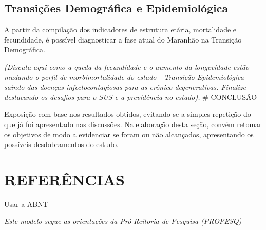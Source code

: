 \documentclass[
  brazilian,
  12pt,
]{article}
\begin{document}
\subsection{Transições Demográfica e
Epidemiológica}\label{transiuxe7uxf5es-demogruxe1fica-e-epidemioluxf3gica}

A partir da compilação dos indicadores de estrutura etária, mortalidade
e fecundidade, é possível diagnosticar a fase atual do Maranhão na
Transição Demográfica.

\emph{(Discuta aqui como a queda da fecundidade e o aumento da
longevidade estão mudando o perfil de morbimortalidade do estado -
Transição Epidemiológica - saindo das doenças infectocontagiosas para as
crônico-degenerativas. Finalize destacando os desafios para o SUS e a
previdência no estado).} \# CONCLUSÃO

Exposição com base nos resultados obtidos, evitando-se a simples
repetição do que já foi apresentado nas discussões. Na elaboração desta
seção, convém retomar os objetivos de modo a evidenciar se foram ou não
alcançados, apresentando os possíveis desdobramentos do estudo.

\section*{REFERÊNCIAS}

Usar a ABNT

\emph{Este modelo segue as orientações da Pró-Reitoria de Pesquisa
(PROPESQ)}
\end{document}
